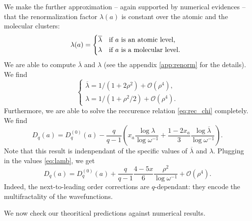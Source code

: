 \documentclass[aps,prl,preprint]{revtex4-1}
\newcommand{\lb}{\ensuremath{\overline{\lambda}}}
\begin{document}
We make the further approximation -- again supported by numerical evidences -- that the renormalization factor $\lambda(a)$ is constant over the atomic and the molecular clusters:
\begin{equation}
	\lambda(a) = \begin{cases*}
	\lb & if $a$ is an atomic level, \\
	\lambda & if $a$ is a molecular level. \\
	\end{cases*}
\end{equation}
We are able to compute $\lb$ and $\lambda$ (see the appendix \eqref{app:renorm} for the details). We find
\begin{equation}
\label{eq:lamb}
	\begin{cases}
		\lb = 1/(1+2\rho^2) + \mathcal{O}(\rho^4), \\
		\lambda = 1/(1+\rho^2/2) + \mathcal{O}(\rho^4).
	\end{cases}
\end{equation}
Furthermore, we are able to solve the reccurence relation \eqref{eq:rec_chi} completely. We find
\begin{equation}
	D_q(a) = D_q^{(0)}(a) - \frac{q}{q-1} \left( x_a \frac{\log \lambda}{\log \omega^{-1}} + \frac{1-2x_a}{3}\frac{\log \lb}{\log \omega^{-1}} \right).
\end{equation}
Note that this result is indenpendant of the specific values of $\lb$ and $\lambda$.
Plugging in the values \eqref{eq:lamb}, we get
\begin{equation}
\label{eq:dqpsi2}
	D_q(a) = D_q^{(0)}(a) + \frac{q}{q-1} \frac{4-5x}{6} \frac{\rho^2}{\log \omega^{-1}} + \mathcal{O}(\rho^4).
\end{equation}
Indeed, the next-to-leading order corrections are $q$-dependant: they encode the multifractality of the wavefunctions.

We now check our theoritical predictions against numerical results.
\end{document}
